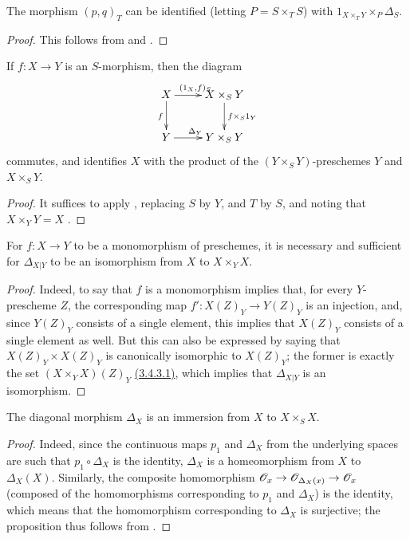 \begin{cor}[5.3.6]
\label{1.5.3.6}
The morphism $(p,q)_T$ can be identified (letting $P=S\times_T S$) with $1_{X\times_T Y}\times_P\Delta_S$.
\end{cor}

\begin{proof}
\label{proof-1.5.3.6}
This follows from  and .
\end{proof}

\begin{cor}[5.3.7]
\label{1.5.3.7}
If $f:X\to Y$ is an $S$-morphism, then the diagram
\[
  \xymatrix{
    X\ar[r]^{(1_X,f)_S}\ar[d]_f &
    X\times_S Y\ar[d]^{f\times_S 1_Y}\\
    Y\ar[r]^{\Delta_Y} &
    Y\times_S Y
  }
\]
commutes, and identifies $X$ with the product of the $(Y\times_S Y)$-preschemes $Y$ and $X\times_S Y$.
\end{cor}

\begin{proof}
\label{proof-1.5.3.7}
It suffices to apply , replacing $S$ by $Y$, and $T$ by $S$, and noting that $X\times_Y Y=X$ .
\end{proof}

\begin{prop}[5.3.8]
\label{1.5.3.8}
For $f:X\to Y$ to be a monomorphism of preschemes, it is necessary and sufficient for $\Delta_{X|Y}$ to be an isomorphism from $X$ to $X\times_Y X$.
\end{prop}

\begin{proof}
\label{1.5.3.8}
Indeed, to say that $f$ is a monomorphism implies that, for every $Y$-prescheme $Z$, the corresponding map $f':X(Z)_Y\to Y(Z)_Y$ is an injection, and, since $Y(Z)_Y$ consists of a single element, this implies that $X(Z)_Y$ consists of a single element as well.
But this can also be expressed by saying that $X(Z)_Y\times X(Z)_Y$ is canonically isomorphic to $X(Z)_Y$; the former is exactly the set $(X\times_Y X)(Z)_Y$ \hyperref[1.3.4.3]{(3.4.3.1)}, which implies that $\Delta_{X|Y}$ is an isomorphism.
\end{proof}

\begin{prop}[5.3.9]
\label{1.5.3.9}
The diagonal morphism $\Delta_X$ is an immersion from $X$ to $X\times_S X$.
\end{prop}

\begin{proof}
\label{proof-1.5.3.9}
Indeed, since the continuous maps $p_1$ and $\Delta_X$ from the underlying spaces are such that $p_1\circ\Delta_X$ is the identity, $\Delta_X$ is a homeomorphism from $X$ to $\Delta_X(X)$.
Similarly, the composite homomorphism $\OO_x\to\OO_{\Delta_X(x)}\to\OO_x$ (composed of the homomorphisms corresponding to $p_1$ and $\Delta_X$) is the identity, which means that the homomorphism corresponding to $\Delta_X$ is surjective;
the proposition thus follows from .
\end{proof}

